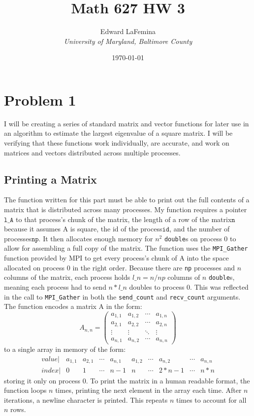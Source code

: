 \documentclass[11pt]{article}
\author{Edward LaFemina \\
		\it{University of Maryland, Baltimore County}}
\title{Math 627 HW 3}
\date{\today}
\begin{document}
\maketitle
\tableofcontents

\pagebreak
\section{Problem 1}
I will be creating a series of standard matrix and vector functions for later use in an algorithm to estimate the largest eigenvalue of a square matrix. I will be verifying that these functions work individually, are accurate, and work on matrices and vectors distributed across multiple processes.

\subsection{Printing a Matrix}
The function written for this part must be able to print out the full contents of a matrix that is distributed across many processes. My function requires a pointer\(\texttt{l\_A}\) to that process's chunk of the matrix, the length of a row of the matrix\(\texttt{n}\) because it assumes A is square, the id of the process\(\texttt{id}\), and the number of processes\(\texttt{np}\). It then allocates enough memory for $ n^2 $ \texttt{double}s on process $ 0 $ to allow for assembling a full copy of the matrix. The function uses the \texttt{MPI\_Gather} function provided by MPI to get every process's chunk of A into the space allocated on process 0 in the right order. Because there are \texttt{np} processes and $ n $ columns of the matrix, each process holds $ l\_n = n / np $ columns of $ n $ \texttt{double}s, meaning each process had to send $ n*l\_n $ doubles to process $ 0 $. This was reflected in the call to \texttt{MPI\_Gather} in both the \texttt{send\_count} and \texttt{recv\_count} arguments. The function encodes a matrix A in the form:
$$
A_{n,n} =
\begin{pmatrix}
	a_{1,1} & a_{1,2} & \cdots & a_{1,n} \\
	a_{2,1} & a_{2,2} & \cdots & a_{2,n} \\
	\vdots  & \vdots  & \ddots & \vdots  \\
	a_{n,1} & a_{n,2} & \cdots & a_{n,n} 
\end{pmatrix}
$$
 to a single array in memory of the form:
$$
\begin{matrix} 
value |& a_{1,1} & a_{2,1} & \cdots & a_{n,1} & a_{1,2} & \cdots & a_{n,2} & \cdots & a_{n,n} \\
index |& 0       & 1       & \cdots & n-1       & n       & \cdots & 2*n - 1   & \cdots & n*n
\end{matrix}
$$
storing it only on process $ 0 $. To print the matrix in a human readable format, the function loops $ n $ times, printing the next element in the array each time. After $ n $ iterations, a newline character is printed. This repeats $ n $ times to account for all $ n $ rows.
\end{document}
